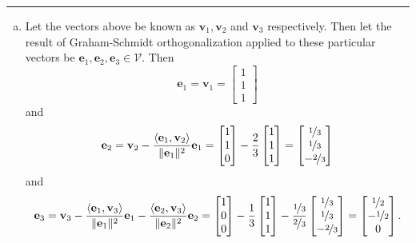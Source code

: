 \documentclass[12pt]{amsart}
\newcommand{\1}{\mathbbm{1}}
\numberwithin{equation}{section}
\numberwithin{Theorem}{section}
\theoremstyle{plain} %
\theoremstyle{definition}
\theoremstyle{remark}
\begin{document}
\begin{enumerate}[1.]
\begin{enumerate}[(a)]
\end{enumerate}\bigskip

\hrule
\bigskip

\begin{enumerate}[(a)]
	\item 
	Let the vectors above be known as \(\mathbf{v}_1, \mathbf{v}_2\) and \(\mathbf{v}_3\) respectively. 
	Then let the result of Graham-Schmidt orthogonalization applied to these particular vectors be \(\mathbf{e}_1,\mathbf{e}_2,\mathbf{e}_3\in\mathcal V\). Then
	\[\mathbf{e}_1=\mathbf{v}_1=\begin{bmatrix} 1\\1\\1	\end{bmatrix}\]
	and
	\[\mathbf{e}_2=
	\mathbf{v}_2
	- \frac{\langle\mathbf{e}_1,\mathbf{v}_2\rangle}{\|\mathbf{e}_1\|^2}\mathbf{e}_1
	= \begin{bmatrix} 1\\1\\0 \end{bmatrix} 
	- \frac{2}{3}\begin{bmatrix} 1\\1\\1 \end{bmatrix}
	= \begin{bmatrix} \nicefrac{1}{3}\\\nicefrac{1}{3}\\-\nicefrac{2}{3} \end{bmatrix} \]
	and
	\[\mathbf{e}_3=
	\mathbf{v}_3
	- \frac{\langle\mathbf{e}_1,\mathbf{v}_3\rangle}{\|\mathbf{e}_1\|^2}\mathbf{e}_1
	- \frac{\langle\mathbf{e}_2,\mathbf{v}_3\rangle}{\|\mathbf{e}_2\|^2}\mathbf{e}_2
	= \begin{bmatrix} 1\\0\\0 \end{bmatrix} 
	- \frac{1}{3}\begin{bmatrix} 1\\1\\1 \end{bmatrix}
	- \frac{\nicefrac{1}{3}}{\nicefrac{2}{3}} 
		\begin{bmatrix} \nicefrac{1}{3}\\\nicefrac{1}{3}\\-\nicefrac{2}{3} \end{bmatrix}
	= \begin{bmatrix} \nicefrac{1}{2}\\-\nicefrac{1}{2}\\0 \end{bmatrix}. \]
	

\end{enumerate}
\end{enumerate}
\end{document}
